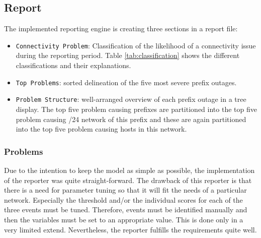 \subsection{Report}
The implemented reporting engine is creating three sections in a report file:
\begin{itemize}
	\item \texttt{Connectivity Problem}: Classification of the likelihood of a connectivity issue during the reporting period. Table \ref{tab:classification} shows the different classifications and their explanations.
	\item \texttt{Top Problems}: sorted delineation of the five most severe prefix outages.
	\item \texttt{Problem Structure}: well-arranged overview of each prefix outage in a tree display. The top five problem causing prefixes are partitioned into the top five problem causing /24 network of this prefix and these are again partitioned into the top five problem causing hosts in this network.
\end{itemize}
\begin{table}[t]
	\newpage
	
\end{table}

\subsubsection{Problems}
Due to the intention to keep the model as simple as possible, the implementation of the reporter was quite straight-forward. The drawback of this reporter is that there is a need for parameter tuning so that it will fit the needs of a particular network. Especially the threshold and/or the individual scores for each of the three events must be tuned. Therefore, events must be identified manually and then the variables must be set to an appropriate value. This is done only in a very limited extend. Nevertheless, the reporter fulfills the requirements quite well.
